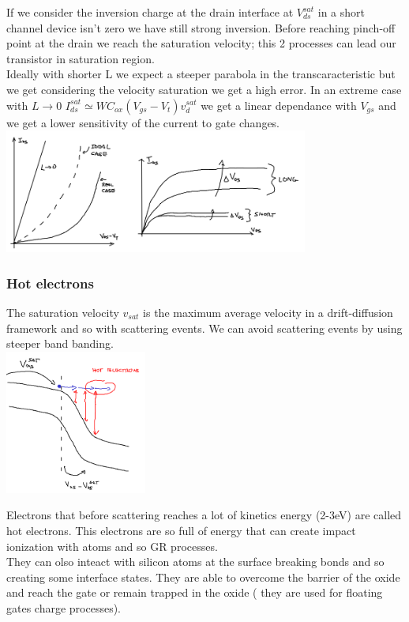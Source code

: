If we consider the inversion charge at the drain interface at $V_{ds}^{sat}$ in a short channel device isn't zero we have still strong inversion. Before reaching pinch-off point at the drain we reach the saturation velocity; this 2 processes can lead our transistor in saturation region.\\
Ideally with shorter L we expect a steeper parabola in the transcaracteristic but we get considering the velocity saturation we get a high error. In an extreme case with $L\rightarrow 0$ $I_{ds}^{sat}\simeq WC_{ox}(V_{gs}-V_t)v_d^{sat}$ we get a linear dependance with $V_{gs}$ and we get a lower sensitivity of the current to gate changes.\\

\centering
\includegraphics[width=0.75\textwidth]{shorta.png}\\
\raggedright

\subsubsection{Hot electrons}
The saturation velocity $v_{sat}$ is the maximum average velocity in a drift-diffusion framework and so with scattering events. We can avoid scattering events by using steeper band banding.\\

\centering
\includegraphics[width=0.35\textwidth]{hotelectrons.png}\\
\raggedright

Electrons that before scattering reaches a lot of kinetics energy (2-3eV) are called hot electrons. This electrons are so full of energy that can create impact ionization with atoms and so GR processes.\\
They can olso inteact with silicon atoms at the surface breaking bonds and so creating some interface states. They are able to overcome the barrier of the oxide and reach the gate or remain trapped in the oxide ( they are used for floating gates charge processes).\\

